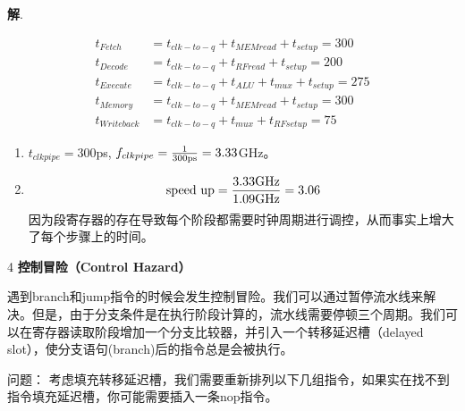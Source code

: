 \documentclass[12pt,a4paper]{article}
\newenvironment{problems}{\begin{list}{}{\renewcommand{\makelabel}[1]{\textbf{##1}.\hfil}}}{\end{list}}
\providecommand{\sol}{\textbf{解}.~}
\begin{document}
\begin{problems}
    \sol 
    
    \begin{align*}
        t_{Fetch}&=t_{clk-to-q}+t_{MEMread}+t_{setup}=300\\
        t_{Decode}&=t_{clk-to-q}+t_{RFread}+t_{setup}=200\\
        t_{Execute}&=t_{clk-to-q}+t_{ALU}+t_{mux}+t_{setup}=275\\
        t_{Memory}&=t_{clk-to-q}+t_{MEMread}+t_{setup}=300\\
        t_{Writeback}&=t_{clk-to-q}+t_{mux}+t_{RFsetup}=75
    \end{align*}


    \begin{enumerate}
        \item $t_{clkpipe}=300$ps, $f_{clkpipe}=\frac{1}{\rm 300ps}=3.33$GHz。
        \item \begin{equation*}
            \rm speed~up=\frac{3.33GHz}{1.09GHz}=3.06
        \end{equation*}
        因为段寄存器的存在导致每个阶段都需要时钟周期进行调控，从而事实上增大了每个步骤上的时间。
    \end{enumerate}

    \item[4] \textbf{控制冒险（Control Hazard） }
    
    遇到branch和jump指令的时候会发生控制冒险。我们可以通过暂停流水线来解决。但是，由于分支条件是在执行阶段计算的，流水线需要停顿三个周期。我们可以在寄存器读取阶段增加一个分支比较器，并引入一个转移延迟槽（delayed slot），使分支语句(branch)后的指令总是会被执行。
    
    问题：
    考虑填充转移延迟槽，我们需要重新排列以下几组指令，如果实在找不到指令填充延迟槽，你可能需要插入一条nop指令。


\end{problems}
\end{document}
